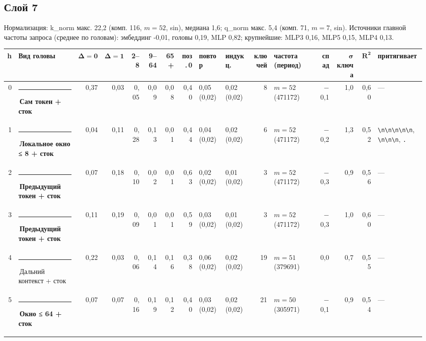 \documentclass[10pt]{article}
\begin{document}
\noindent\begin{minipage}{\linewidth}
\subsection*{Слой 7}
{\small\color{ink2} Нормализация: k\_norm макс. 22,2 (комп. 116, $m{=}52$, sin), медиана 1,6; q\_norm макс. 5,4 (комп. 71, $m{=}7$, sin). Источники главной частоты запроса (среднее по головам): эмбеддинг -0,01, головы 0,19, MLP 0,82; крупнейшие: MLP3 0,16, MLP5 0,15, MLP4 0,13.}
\begin{center}{\footnotesize\begin{tabular}{|r|l|r|r|r|r|r|r|l|l|r|l|r|r|r|l|}
\hline
\rowcolor{head}\textbf{h} & \textbf{Вид головы} & $\boldsymbol{\Delta{=}0}$ & $\boldsymbol{\Delta{=}1}$ & \textbf{2–8} & \textbf{9–64} & \textbf{65+} & \textbf{поз.\,0} & \textbf{повтор} & \textbf{индукц.} & \textbf{ключей} & \textbf{частота (период)} & \textbf{спад} & $\boldsymbol{\sigma}$ \textbf{ключа} & $\boldsymbol{R^2}$ & \textbf{притягивает} \\ \hline
0 & \textcolor[HTML]{2A78D6}{\rule{0.62em}{0.62em}}\,\textbf{Сам токен + сток} & 0,37 & 0,03 & 0,05 & 0,09 & 0,08 & 0,40 & 0,05 (0,02) & 0,02 (0,02) & 8 & $m{=}52$ (471172) & $-$0,1 & 1,0 & 0,60 & — \\ \hline
1 & \textcolor[HTML]{1BAF7A}{\rule{0.62em}{0.62em}}\,\textbf{Локальное окно ≤ 8 + сток} & 0,04 & 0,11 & 0,28 & 0,13 & 0,01 & 0,44 & 0,04 (0,02) & 0,02 (0,02) & 6 & $m{=}52$ (471172) & $-$0,2 & 1,3 & 0,52 & \texttt{\textvisiblespace{}\textbackslash{}n\textbackslash{}n\textbackslash{}n\textbackslash{}n\textbackslash{}n}, \texttt{\textvisiblespace{}\textbackslash{}n\textbackslash{}n\textbackslash{}n}, \texttt{\textvisiblespace{}.} \\ \hline
2 & \textcolor[HTML]{2A78D6}{\rule{0.62em}{0.62em}}\,\textbf{Предыдущий токен + сток} & 0,07 & 0,18 & 0,10 & 0,02 & 0,01 & 0,63 & 0,02 (0,02) & 0,01 (0,02) & 3 & $m{=}52$ (471172) & $-$0,3 & 0,9 & 0,56 & — \\ \hline
3 & \textcolor[HTML]{2A78D6}{\rule{0.62em}{0.62em}}\,\textbf{Предыдущий токен + сток} & 0,11 & 0,19 & 0,09 & 0,01 & 0,01 & 0,59 & 0,03 (0,02) & 0,01 (0,02) & 3 & $m{=}52$ (471172) & $-$0,3 & 1,0 & 0,60 & — \\ \hline
4 & \textcolor[HTML]{C3C2B7}{\rule{0.62em}{0.62em}}\,Дальний контекст + сток & 0,22 & 0,03 & 0,06 & 0,14 & 0,16 & 0,38 & 0,06 (0,02) & 0,02 (0,02) & 19 & $m{=}51$ (379691) & 0,0 & 0,7 & 0,55 & — \\ \hline
5 & \textcolor[HTML]{EDA100}{\rule{0.62em}{0.62em}}\,\textbf{Окно ≤ 64 + сток} & 0,07 & 0,07 & 0,16 & 0,19 & 0,12 & 0,40 & 0,03 (0,02) & 0,02 (0,02) & 21 & $m{=}50$ (305971) & $-$0,1 & 0,9 & 0,54 & — \\ \hline

\end{tabular}}
\end{center}
\end{minipage}
\end{document}
